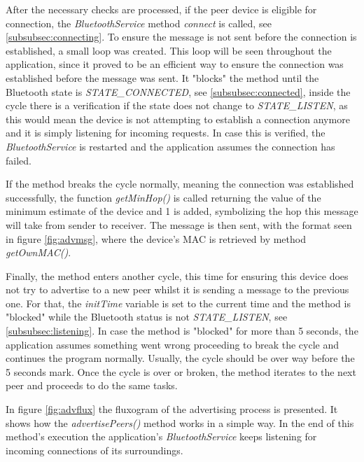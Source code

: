 After the necessary checks are processed, if the peer device is eligible for connection, the \textit{BluetoothService} method \textit{connect} is called, see \ref{subsubsec:connecting}. To ensure the message is not sent before the connection is established, a small loop was created. This loop will be seen throughout the application, since it proved to be an efficient way to ensure the connection was established before the message was sent. It "blocks" the method until the Bluetooth state is \textit{STATE\_CONNECTED}, see \ref{subsubsec:connected}, inside the cycle there is a verification if the state does not change to \textit{STATE\_LISTEN}, as this would mean the device is not attempting to establish a connection anymore and it is simply listening for incoming requests. In case this is verified, the \textit{BluetoothService} is restarted and the application assumes the connection has failed.

If the method breaks the cycle normally, meaning the connection was established successfully, the function \textit{getMinHop()} is called returning the value of the minimum estimate of the device and 1 is added, symbolizing the hop this message will take from sender to receiver. The message is then sent, with the format seen in figure \ref{fig:advmsg}, where the device's \gls{MAC} is retrieved by method \textit{getOwnMAC()}.

Finally, the method enters another cycle, this time for ensuring this device does not try to advertise to a new peer whilst it is sending a message to the previous one. For that, the \textit{initTime} variable is set to the current time and the method is "blocked" while the Bluetooth status is not \textit{STATE\_LISTEN}, see \ref{subsubsec:listening}. In case the method is "blocked" for more than 5 seconds, the application assumes something went wrong proceeding to break the cycle and continues the program normally. Usually, the cycle should be over way before the 5 seconds mark. Once the cycle is over or broken, the method iterates to the next peer and proceeds to do the same tasks.

In figure \ref{fig:advflux} the fluxogram of the advertising process is presented. It shows how the \textit{advertisePeers()} method works in a simple way. In the end of this method's execution the application's \textit{BluetoothService} keeps listening for incoming connections of its surroundings.

